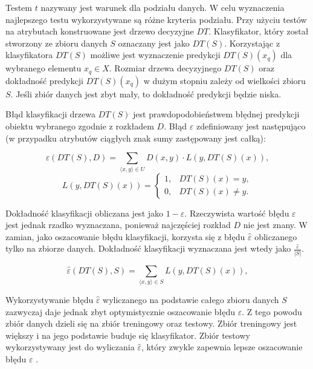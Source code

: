 \documentclass[12pt]{article}
\begin{document}
Testem $t$ nazywany jest warunek dla podziału danych. W celu wyznaczenia najlepszego testu wykorzystywane
są różne kryteria podziału. Przy użyciu testów na atrybutach konstruowane jest drzewo decyzyjne $DT$.
Klasyfikator, który został stworzony ze zbioru danych $S$ oznaczany jest jako $DT(S)$. Korzystając z klasyfikatora
$DT(S)$ możliwe jest wyznaczenie predykcji $DT(S)(x_q)$ dla wybranego elementu $x_q \in X$. Rozmiar drzewa decyzyjnego $DT(S)$ oraz dokładność predykcji $DT(S)(x_q)$
w dużym stopniu zależy od wielkości zbioru $S$. Jeśli zbiór danych jest zbyt mały, to dokładność predykcji będzie niska.

Błąd klasyfikacji drzewa $DT(S)$ jest prawdopodobieństwem błędnej predykcji obiektu wybranego zgodnie z rozkładem $D$.
Błąd $\varepsilon$ zdefiniowany jest następująco (w przypadku atrybutów ciągłych znak sumy zastępowany jest całką):

\begin{equation}
    \varepsilon(DT(S), D) = \displaystyle\sum_{\langle x, y\rangle \in U} D(x, y) \cdot L(y, DT(S)(x)),
\end{equation}
\begin{equation}
    L(y, DT(S)(x)) = \left\{
        \begin{array}{ll}
            1, & DT(S)(x) = y, \\
            0, & DT(S)(x) \neq y.
        \end{array} \right.
\end{equation}

\vspace{0.8cm}

Dokładność klasyfikacji obliczana jest jako $1 - \varepsilon$.
Rzeczywista wartość błędu $\varepsilon$ jest jednak rzadko wyznaczana, ponieważ najczęściej rozkład $D$ nie jest znany.
W zamian, jako oszacowanie błędu klasyfikacji, korzysta się z błędu $\hat{\varepsilon}$
obliczanego tylko na zbiorze danych. Dokładność klasyfikacji wyznaczana jest wtedy jako $\frac{\hat{\varepsilon}}{|S|}$.

\begin{equation}
    \hat{\varepsilon}(DT(S), S) = \displaystyle\sum_{\langle x, y\rangle \in S} L(y, DT(S)(x)),
\end{equation}

\vspace{0.8cm}

Wykorzystywanie błędu $\hat{\varepsilon}$ wyliczanego na podstawie całego zbioru danych $S$ zazwyczaj daje jednak
zbyt optymistycznie oszacowanie błędu $\varepsilon$. Z tego powodu zbiór danych dzieli się na zbiór
treningowy oraz testowy. Zbiór treningowy jest większy i na jego podstawie buduje się klasyfikator.
Zbiór testowy wykorzystywany jest do wyliczania $\hat{\varepsilon}$, który zwykle zapewnia
lepsze oszacowanie błędu $\varepsilon$ \cite{data-mining-with-decision-trees}.
\end{document}

